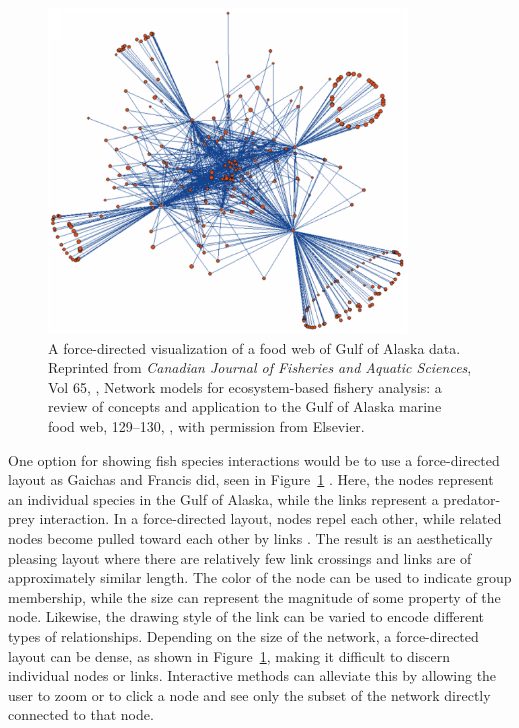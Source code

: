 \begin{figure}[h]
	\centering
	\includegraphics[width=0.85\textwidth]{figures/png/gaichas.png}
	\caption[A force-directed visualization of a food web of Gulf of Alaska data]{A force-directed visualization of a food web of Gulf of Alaska data. Reprinted from \textit{Canadian Journal of Fisheries and Aquatic Sciences}, Vol 65, \citeauthor{gaichas2008}, Network models for ecosystem-based fishery analysis: a review of concepts and application to the Gulf of Alaska marine food web, 129--130, \textcopyright \citeyear{gaichas2008}, with permission from Elsevier.}
	\label{fig:gaichas}
\end{figure}

One option for showing fish species interactions would be to use a force-directed layout as Gaichas and Francis did, seen in Figure~\ref{fig:gaichas} \citeyearpar{gaichas2008}.  Here, the nodes represent an individual species in the Gulf of Alaska, while the links represent a predator-prey interaction.  In a force-directed layout, nodes repel each other, while related nodes become pulled toward each other by links \cite{heer2010}.  The result is an aesthetically pleasing layout where there are relatively few link crossings and links are of approximately similar length.  The color of the node can be used to indicate group membership, while the size can represent the magnitude of some property of the node.  Likewise, the drawing style of the link can be varied to encode different types of relationships.  Depending on the size of the network, a force-directed layout can be dense, as shown in Figure~\ref{fig:gaichas}, making it difficult to discern individual nodes or links.  Interactive methods can alleviate this by allowing the user to zoom or to click a node and see only the subset of the network directly connected to that node.

